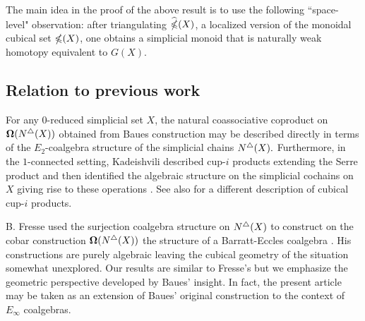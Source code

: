 

The main idea in the proof of the above result is to use the following ``space-level" observation: after triangulating $\widehat{\mathbb{\Omega}}({X})$, a localized version of the monoidal cubical set $\mathbb{\Omega}(X)$, one obtains a simplicial monoid that is naturally weak homotopy equivalent to $G(X).$ 

\subsection*{Relation to previous work}

For any $0$-reduced simplicial set $X$, the natural coassociative coproduct on $\operatorname{\mathbf{\Omega}} (N^{\triangle} (X))$ obtained from Baues construction may be described directly in terms of the $E_2$-coalgebra structure of the simplicial chains $N^{\triangle}(X).$ Furthermore, in the $1$-connected setting, Kadeishvili described cup-$i$ products extending the Serre product and then identified the algebraic structure on the simplicial cochains on $X$ giving rise to these operations \cite{kadeishvili1999coproducts, kadeishvili2003cup-i}.
See also \cite{pilarczyk2016cubical} for a different description of cubical cup-$i$ products.

B. Fresse used the surjection coalgebra structure on $N^{\triangle}(X)$ to construct on the cobar construction $\operatorname{\mathbf{\Omega}}(N^{\triangle}(X))$ the  structure of a Barratt-Eccles coalgebra \cite{fresse2003hopf}.
His constructions are purely algebraic leaving the cubical geometry of the situation somewhat unexplored.
Our results are similar to Fresse's but we emphasize the geometric perspective developed by Baues' insight.
In fact, the present article may be taken as an extension of Baues' original construction to the context of $E_{\infty}$ coalgebras.

